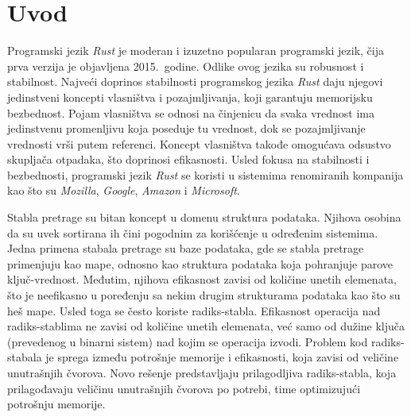 \documentclass[12pt,oneside]{memoir}
\begin{document}
\frontmatter
\naslovna
\komisija
\apstrakt
\tableofcontents*

\mainmatter

\chapter{Uvod}
Programski jezik \textit{Rust} je moderan i izuzetno popularan programski jezik,
čija prva verzija je objavljena 2015.\ godine. Odlike ovog jezika su
robusnost i stabilnost. Najveći doprinos stabilnosti
programskog jezika \textit{Rust} daju
njegovi jedinstveni koncepti vlasništva i pozajmljivanja, koji garantuju
memorijsku bezbednost. Pojam vlasništva se odnosi
na činjenicu da svaka vrednost ima jedinstvenu promenljivu koja poseduje
tu vrednost, dok se pozajmljivanje vrednosti vrši putem referenci.
Koncept vlasništva takođe
omogućava odsustvo skupljača otpadaka, što doprinosi efikasnosti.
Usled fokusa na stabilnosti i bezbednosti, programski jezik \textit{Rust}
se koristi u sistemima renomiranih kompanija kao što su
\textit{Mozilla}, \textit{Google}, \textit{Amazon}
i \textit{Microsoft}.

Stabla pretrage su bitan koncept u domenu struktura podataka.
Njihova osobina da su uvek sortirana ih čini pogodnim za korišćenje
u određenim sistemima.
Jedna primena stabala pretrage su baze podataka, gde se stabla pretrage
primenjuju kao mape, odnosno kao struktura podataka koja pohranjuje
parove ključ-vrednost.
Međutim, njihova efikasnost
zavisi od količine unetih elemenata, što je neefikasno u poređenju sa nekim
drugim strukturama podataka kao što su heš mape.
Usled toga se često koriste
radiks-stabla. Efikasnost operacija
nad radiks-stablima ne zavisi od količine unetih elemenata,
već samo od dužine ključa (prevedenog u binarni sistem) nad kojim se operacija izvodi.
Problem kod radiks-stabala je sprega između potrošnje memorije i efikasnosti,
koja zavisi od veličine unutrašnjih čvorova.
Novo rešenje predstavljaju
prilagodljiva radiks-stabla, koja prilagođavaju veličinu unutrašnjih čvorova
po potrebi, time optimizujući potrošnju memorije.
\end{document}
